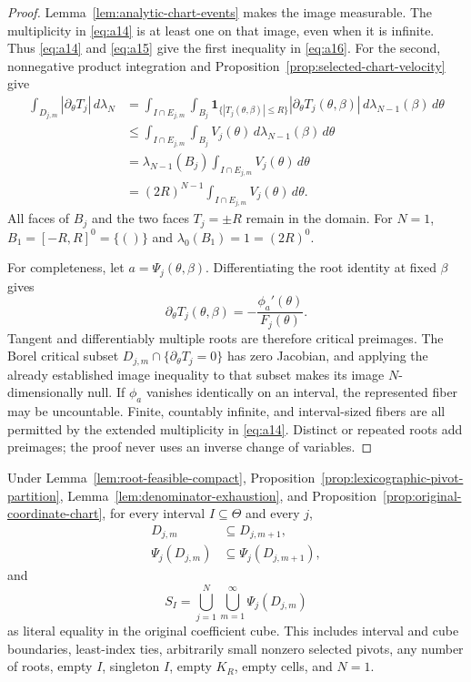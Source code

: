 \begin{proof}
Lemma~\ref{lem:analytic-chart-events} makes the image measurable.  The
multiplicity in \eqref{eq:a14} is at least one on that image, even when it
is infinite.  Thus \eqref{eq:a14} and \eqref{eq:a15} give the first
inequality in \eqref{eq:a16}.  For the second, nonnegative product
integration and Proposition~\ref{prop:selected-chart-velocity} give
\[
\begin{aligned}
\int_{D_{j,m}}|\partial_\theta T_j|\,d\lambda_N
&=\int_{I\cap E_{j,m}}\int_{B_j}
 \mathbf 1_{\{|T_j(\theta,\beta)|\leq R\}}
 |\partial_\theta T_j(\theta,\beta)|
 \,d\lambda_{N-1}(\beta)\,d\theta\\
&\leq\int_{I\cap E_{j,m}}\int_{B_j}V_j(\theta)
 \,d\lambda_{N-1}(\beta)\,d\theta\\
&=\lambda_{N-1}(B_j)
 \int_{I\cap E_{j,m}}V_j(\theta)\,d\theta\\
&=(2R)^{N-1}\int_{I\cap E_{j,m}}V_j(\theta)\,d\theta.
\end{aligned}
\tag{A20}\label{eq:a20}
\]
All faces of $B_j$ and the two faces $T_j=\pm R$ remain in the domain.
For $N=1$, $B_1=[-R,R]^0=\{()\}$ and
$\lambda_0(B_1)=1=(2R)^0$.

For completeness, let $a=\Psi_j(\theta,\beta)$.  Differentiating the root
identity at fixed $\beta$ gives
\[
\partial_\theta T_j(\theta,\beta)
=-\frac{\phi_a'(\theta)}{F_j(\theta)}.
\tag{A21}\label{eq:a21}
\]
Tangent and differentiably multiple roots are therefore critical
preimages.  The Borel critical subset
$D_{j,m}\cap\{\partial_\theta T_j=0\}$ has zero Jacobian, and applying the
already established image inequality to that subset makes its image
$N$-dimensionally null.  If $\phi_a$ vanishes identically on an interval,
the represented fiber may be uncountable.  Finite, countably infinite, and
interval-sized fibers are all permitted by the extended multiplicity in
\eqref{eq:a14}.  Distinct or repeated roots add preimages; the proof never
uses an inverse change of variables.
\end{proof}

\begin{lemma}
\label{lem:exact-root-event-coverage}
Under Lemma~\ref{lem:root-feasible-compact},
Proposition~\ref{prop:lexicographic-pivot-partition},
Lemma~\ref{lem:denominator-exhaustion}, and
Proposition~\ref{prop:original-coordinate-chart}, for every interval
$I\subseteq\Theta$ and every $j$,
\[
\begin{aligned}
D_{j,m}&\subseteq D_{j,m+1},\\
\Psi_j(D_{j,m})&\subseteq\Psi_j(D_{j,m+1}),
\end{aligned}
\tag{A22}\label{eq:a22}
\]
and
\[
S_I=\bigcup_{j=1}^N\bigcup_{m=1}^\infty\Psi_j(D_{j,m})
\tag{A23}\label{eq:a23}
\]
as literal equality in the original coefficient cube.  This includes
interval and cube boundaries, least-index ties, arbitrarily small nonzero
selected pivots, any number of roots, empty $I$, singleton $I$, empty
$K_R$, empty cells, and $N=1$.
\end{lemma}

